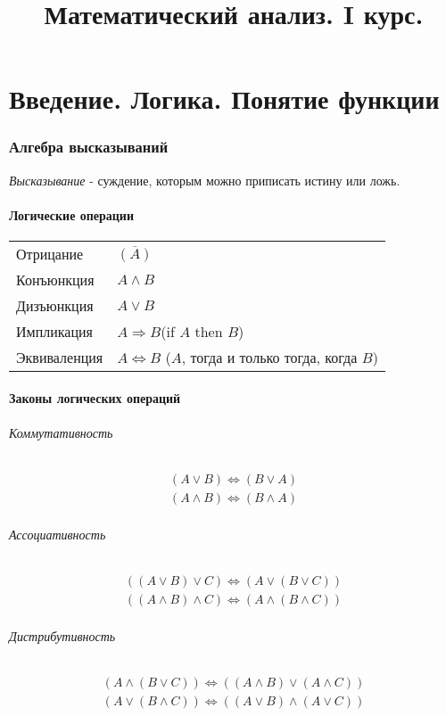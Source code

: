 \documentclass[10pt]{article}
\title{Математический анализ. I курс.}
\author{}
\date{}
\begin{document}
\maketitle

\part{Введение. Логика. Понятие функции}
\section{Алгебра высказываний}
	\textit{Высказывание} - суждение, которым можно приписать истину или ложь.
	\subsection{Логические операции}
		\begin{tabular}{l l}
			Отрицание & $\overline{(A)}$ \\
			Конъюнкция & $A \wedge B$ \\
			Дизъюнкция & $A \vee B$ \\
			Импликация & $A \Rightarrow B $(if $A$ then $B$) \\
			Эквиваленция & $A \Leftrightarrow B$ ($A$, тогда и только тогда, когда $B$)
		\end{tabular}
	\subsection{Законы логических операций}
		\paragraph{Коммутативность}
		\begin{eqnarray}
			(A \vee B) \Leftrightarrow (B \vee A) \\
			(A \wedge B) \Leftrightarrow (B \wedge A)
		\end{eqnarray}
		\paragraph{Ассоциативность}
		\begin{eqnarray}
			((A \vee B) \vee C) \Leftrightarrow (A \vee (B \vee C)) \\
			((A \wedge B) \wedge C) \Leftrightarrow (A \wedge (B \wedge C))
		\end{eqnarray}
		\paragraph{Дистрибутивность}
		\begin{eqnarray}
			(A \wedge (B \vee C)) \Leftrightarrow ((A \wedge B) \vee (A \wedge C)) \\
			(A \vee (B \wedge C)) \Leftrightarrow ((A \vee B) \wedge (A \vee C))
		\end{eqnarray}
\end{document}
